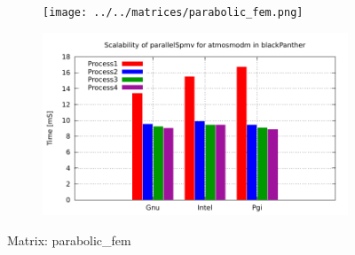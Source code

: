\begin{figure} [ht!]
    \centering
    \captionsetup{justification=centering, singlelinecheck=false}
    \begin{subfigure}{.65\textwidth}
      \centering
      \hspace*{-3.5cm} 
      \texttt{[image: ../../matrices/parabolic\_fem.png]}
      \label{fig:parabolic_fem_matrix}
    \end{subfigure}%
    \begin{subfigure}{.65\textwidth}
      \centering
      \hspace*{-6.0cm} 
      \includegraphics[page=4, width=0.95\linewidth]{../plots/blackPanther.pdf}
      \label{fig:parabolic_fem_performance}
    \end{subfigure}
\caption{Matrix: parabolic\_fem}
\label{fig:parabolic_fem}
\end{figure}

